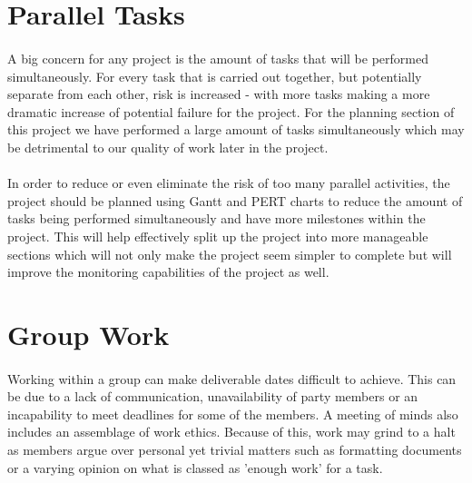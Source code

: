 \documentclass{article}
\begin{document}
\maketitle

\section{Parallel Tasks}
\paragraph{}
\cite{OracleWP}
A big concern for any project is the amount of tasks that will be performed
simultaneously.  For every task that is carried out together, but potentially
separate from each other, risk is increased - with more tasks making a more
dramatic increase of potential failure for the project.  For the planning
section of this project we have performed a large amount of tasks simultaneously
which may be detrimental to our quality of work later in the project.

\paragraph{}

In order to reduce or even eliminate the risk of too many parallel activities,
the project should be planned using Gantt and PERT charts to reduce the amount
of tasks being performed simultaneously and have more milestones within the
project.  This will help effectively split up the project into more manageable
sections which will not only make the project seem simpler to complete but will
improve the monitoring capabilities of the project as well.

\section{Group Work}
\paragraph{}

Working within a group can make deliverable dates difficult to achieve.  This
can be due to a lack of communication, unavailability of party members or an
incapability to meet deadlines for some of the members.  A meeting of minds also
includes an assemblage of work ethics.  Because of this, work may grind to a
halt as members argue over personal yet trivial matters such as formatting
documents or a varying opinion on what is classed as 'enough work' for a task.
\end{document}
